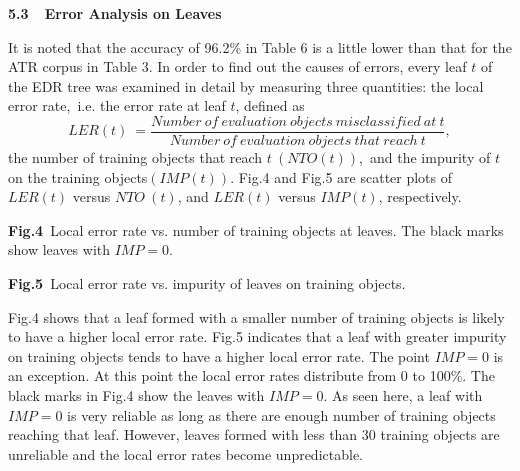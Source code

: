 \vspace{5pt}
\begin{flushleft}
{\large \bf 5.3\ \ Error Analysis on  Leaves }
\end{flushleft}

It is noted that the accuracy  of 96.2\% in Table 6 is a little lower
than that  for   the ATR corpus in Table 3. In order to find out the causes of errors,
every leaf $t$ of the EDR tree was examined in detail by measuring three quantities:
the local error rate,\ i.e. the error rate  at leaf $t$, defined as
\vspace{3pt}
\[LER(t)\ = \frac{Number\ of\ evaluation\ objects\ misclassified\ at\ 
t}{Number\ of\ evaluation\ objects\ that\ reach\ t},\]
the number of training objects that reach $t\ (NTO(t))$,\ and the impurity of
$t$ on the training objects$(IMP(t))$.
Fig.4 and Fig.5 are scatter plots of $LER(t)$ versus $NTO\ (t)$,
and $LER(t)$ versus $IMP(t)$, respectively.
\begin{table}[t]
\begin{center}	
\end{center}
\begin{center}
{\bf Fig.4}\  Local error rate vs. number of training objects  at
leaves. The black marks show leaves with $IMP=0$.
\end{center}
\end{table}
\begin{table}[t]
\begin{center}
\end{center}
\begin{center}
{\bf Fig.5}\  Local error rate vs. impurity of leaves on  training objects. 
\end{center}
\end{table}

 Fig.4 shows that a leaf formed 
with  a smaller number of training objects is likely to have a higher
local error
rate. Fig.5 indicates that a leaf with  greater impurity on training 
objects tends to have a higher local error rate. 
The point $IMP= 0$ is an
exception. At this point the local error rates distribute from
0 to 100\%. The black marks in Fig.4 show the leaves with $IMP=0$. As 
seen   here, a leaf with $IMP= 0$ is very reliable as long as there are
enough number of training objects reaching that leaf. However, leaves
formed with less than 30 training objects are unreliable
and the local error rates  become unpredictable. 

